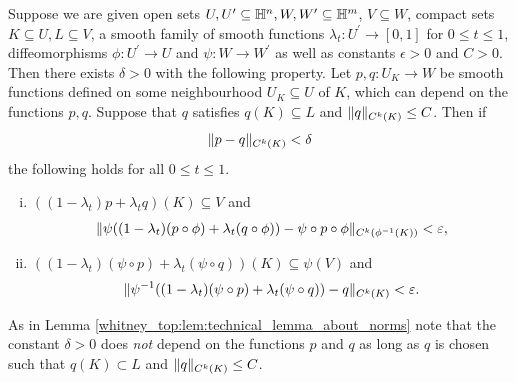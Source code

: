 \begin{lemma}
    \label{whitney_top:lem:lemma_for_homotopy_prop}
    Suppose we are given open sets $U, U^\prime \subseteq \mathbb{H}^n, W, W^\prime \subseteq \mathbb{H}^m$, $V \subseteq W$, compact sets $K \subseteq U, L \subseteq V$, a smooth family of smooth functions $\lambda_t \colon U^\prime \to [0,1]$ for $0 \leq t \leq 1$, diffeomorphisms $\phi \colon U^\prime \to U$ and $\psi \colon W \to W^\prime$ as well as constants $\epsilon > 0$ and $C > 0$. Then there exists $\delta >0$ with the following property. Let $p,q \colon U_K \to W$ be smooth functions defined on some neighbourhood $U_K \subseteq U$ of $K$, which can depend on the functions $p,q$. Suppose that $q$ satisfies $q(K) \subseteq L$ and $\lVert q\rVert_{C^k(K)} \leq C$. Then if
    \[
    \lVert p-q\rVert_{C^k(K)} < \delta
    \]
    the following holds for all $0 \leq t \leq 1$. 
    \begin{enumerate}[(i)]
        \item \label{whitney_top:eq:lemma_for_homotopy_prop_part1} $((1-\lambda_t)p + \lambda_t q)(K) \subseteq V$ and
    \[
        \lVert\psi((1-\lambda_t) (p \circ \phi) + \lambda_t (q \circ \phi)) - \psi \circ p \circ \phi\rVert_{C^k(\phi^{-1}(K))} < \varepsilon,
    \]
    \item \label{whitney_top:eq:lemma_for_homotopy_prop_part2} $((1-\lambda_t)(\psi \circ p) + \lambda_t (\psi \circ q))(K) \subseteq \psi(V)$ and 
    \[
    \lVert\psi^{-1}((1-\lambda_t) (\psi \circ p) + \lambda_t (\psi \circ q)) - q\rVert_{C^k(K)} < \varepsilon.
    \]
    \end{enumerate}
\end{lemma}

As in Lemma \ref{whitney_top:lem:technical_lemma_about_norms} note that the constant $\delta > 0$ does \textit{not} depend on the functions $p$ and $q$ as long as $q$ is chosen such that $q(K) \subset L$ and $\lVert q\rVert_{C^k(K)} \leq C$. 

